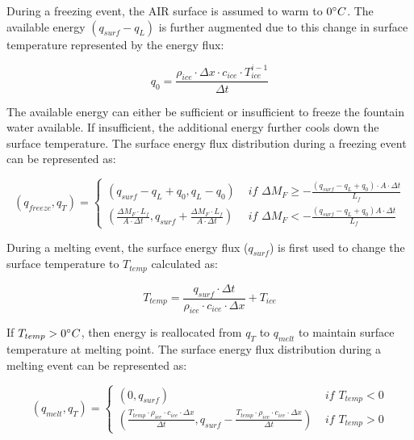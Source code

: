 \documentclass[utf8]{frontiersSCNS} %
\begin{document}
During a freezing event, the AIR surface is assumed to warm to $0 \degree C$. The available energy
$(q_{surf}-q_{L})$ is further augmented due to this change in surface temperature represented by the energy
flux:

$$q_{0} = \frac{\rho_{ice} \cdot \Delta x \cdot c_{ice} \cdot T_{ice}^{i-1}}{\Delta t}$$

The available energy can either be sufficient or insufficient to freeze the fountain water available. If
insufficient, the additional energy further cools down the surface temperature. The surface energy flux
distribution during a freezing event can be represented as:

\begin{equation}
	(q_{freeze}, q_{T}) = \left\{ \begin{array}{ll}
		(q_{surf}-q_{L}+q_{0}, q_{L}-q_{0}) & \textit{ if } \Delta M_{F} \geq -\frac{(q_{surf}-q_{L}+q_{0}) \cdot A \cdot \Delta
		t}{L_f}                                                                                                                  \\
		(\frac{\Delta M_{F} \cdot L_f
		}{A \cdot \Delta t}
		, q_{surf}+\frac{\Delta M_{F} \cdot L_f
		}{A \cdot \Delta t})                & \textit{ if } \Delta M_{F} < -\frac{(q_{surf}-q_{L}+q_0) A \cdot \Delta
		t}{L_f}
	\end{array} \right.
\end{equation}

During a melting event, the surface energy flux ($q_{surf}$) is first used to change the surface temperature to
$T_{temp}$ calculated as:

\begin{equation} T_{temp} =\frac{q_{surf} \cdot \Delta t}{\rho_{ice} \cdot c_{ice} \cdot \Delta x} + T_{ice} \end{equation}

If $T_{temp} > 0 \degree C$, then energy is reallocated from $q_{T}$ to $q_{melt}$ to maintain surface
temperature at melting point. The surface energy flux distribution during a melting event can be represented as:

\begin{equation}
	(q_{melt}, q_{T}) = \left\{ \begin{array}{ll}
		(0, q_{surf})                                                                                                                                                 & \textit{ if } T_{temp} < 0 \\
		(\frac{T_{temp} \cdot \rho_{ice} \cdot c_{ice} \cdot \Delta x}{\Delta t}, q_{surf}-\frac{T_{temp} \cdot \rho_{ice} \cdot c_{ice} \cdot \Delta x}{\Delta t}  ) & \textit{ if } T_{temp} > 0
	\end{array} \right.
\end{equation}
\end{document}
